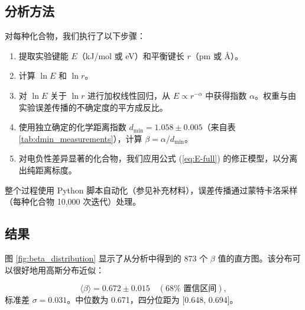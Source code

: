 \documentclass[11pt,a4paper]{article}
\begin{document}
	\subsection{分析方法}
	
	对每种化合物，我们执行了以下步骤：
	
	\begin{enumerate}
		\item 提取实验键能 \(E\)（kJ/mol 或 eV）和平衡键长 \(r\)（pm 或 Å）。
		\item 计算 \(\ln E\) 和 \(\ln r\)。
		\item 对 \(\ln E\) 关于 \(\ln r\) 进行加权线性回归，从 \(E \propto r^{-\alpha}\) 中获得指数 \(\alpha\)。权重与由实验误差传播的不确定度的平方成反比。
		\item 使用独立确定的化学距离指数 \(d_{\text{min}} = 1.058 \pm 0.005\)（来自表 \ref{tab:dmin_measurements}），计算 \(\beta = \alpha / d_{\text{min}}\)。
		\item 对电负性差异显著的化合物，我们应用公式 (\ref{eq:E-full}) 的修正模型，以分离出纯距离标度。
	\end{enumerate}
	
	整个过程使用 Python 脚本自动化（参见补充材料），误差传播通过蒙特卡洛采样（每种化合物 10,000 次迭代）处理。
	
	\subsection{结果}
	
	图 \ref{fig:beta_distribution} 显示了从分析中得到的 873 个 \(\beta\) 值的直方图。该分布可以很好地用高斯分布近似：
	
	\begin{equation}
		\langle \beta \rangle = 0.672 \pm 0.015 \quad (68\% \text{ 置信区间}), 
		\label{eq:beta_mean}
	\end{equation}
	标准差 \(\sigma = 0.031\)。中位数为 0.671，四分位距为 [0.648, 0.694]。
	
\end{document}

